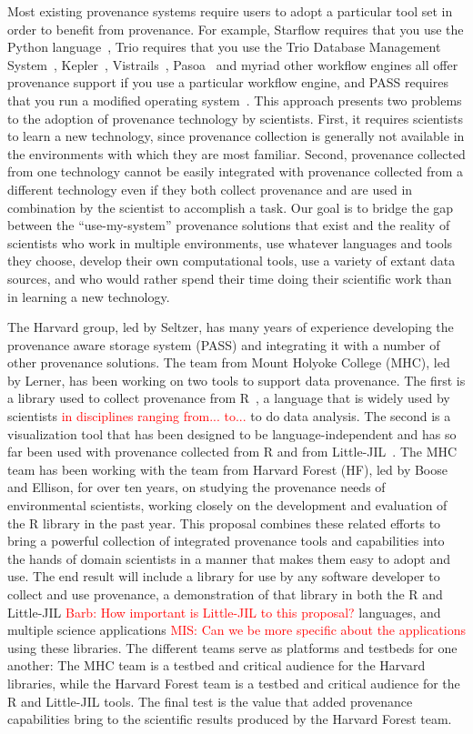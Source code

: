 \documentclass[10pt]{article}
\newcommand{\todo}[1]{\textcolor{red}{#1}}
\newcommand{\TODO}[1]{\todo{#1}}
\begin{document}
Most existing provenance systems require users to adopt a particular tool
set in order to benefit from provenance.
For example, Starflow requires that you use the Python
language~\cite{starflow},
Trio requires that you use the Trio Database Management System~\cite{trio},
Kepler~\cite{kepler},
Vistrails~\cite{vistrails-sigmod06,vistrails-ssdbm08},
Pasoa~\cite{pasoa} and
myriad other workflow engines all offer provenance support if you use
a particular workflow engine,
and PASS requires that you run a modified operating
system~\cite{pass-usenix06}.
This approach presents two problems to the adoption of provenance technology
by scientists.  First, it requires scientists to learn a new technology, since provenance
collection is generally not available in the environments with which they are most familiar.
Second, provenance collected from one technology cannot be easily integrated
with provenance collected from a different technology even if they both collect provenance 
and are used in combination by the scientist to accomplish a task.
Our goal is to bridge the gap between the ``use-my-system'' provenance
solutions that exist and the reality of scientists who work in multiple
environments, use whatever languages and tools they choose, develop
their own computational tools, use a variety of extant data sources, and who
would rather spend their time doing their scientific work than in learning a new
technology.

The Harvard group, led by Seltzer, has many years of experience 
developing the provenance aware
storage system (PASS) and integrating it with a number of other provenance
solutions.
The team from Mount Holyoke College (MHC), led by Lerner,
has been working on two tools to support data provenance.
The first is a library used to collect provenance from R~\cite{R}, a language that is widely used 
by scientists \todo{in disciplines ranging from... to...} to do data analysis.
The second is a visualization tool that has been designed to be language-independent and 
has so far been used with provenance collected from R and from Little-JIL~\cite{LitteJIL}.
The MHC team has been working with the team from 
Harvard Forest (HF), led by Boose and Ellison, for over ten years,
on studying the provenance needs of environmental scientists, working closely on
the development and evaluation of the R library in the past year.
This proposal combines these related efforts to bring a powerful collection of
integrated provenance tools and capabilities into the hands of domain scientists
in a manner that makes them easy to adopt and use.
The end result will include a library for use
by any software developer to collect and use provenance,
a demonstration of that library in both the R and Little-JIL \todo{Barb: How important 
is Little-JIL to  this proposal?}
languages, and multiple science applications \TODO{MIS: Can we be more
specific about the applications} using these
libraries.
The different teams serve as platforms and testbeds for one another:
The MHC team is a testbed and critical audience for the Harvard libraries,
while the Harvard Forest team is a testbed and critical audience for the
R and Little-JIL tools.
The final test is the value that added provenance capabilities bring
to the scientific results produced by the Harvard Forest team.
\end{document}
